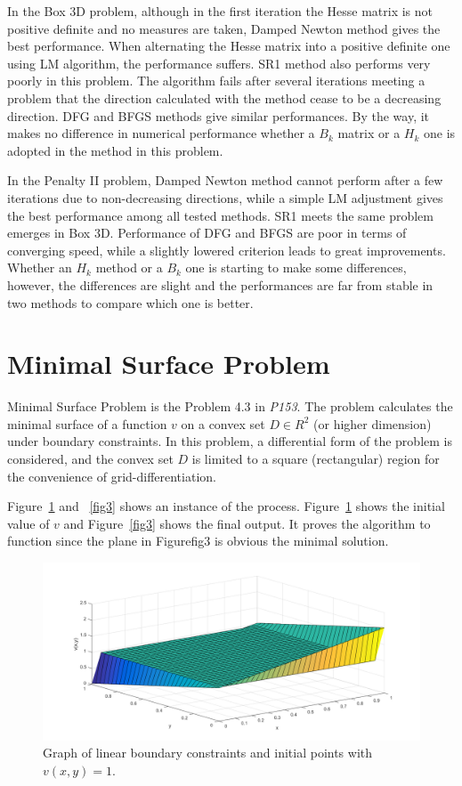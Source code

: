 \documentclass{article}
\begin{document}
In the Box 3D problem, although in the first iteration the Hesse matrix is not positive definite and no measures are taken, Damped Newton method gives the best performance. When alternating the Hesse matrix into a positive definite one using LM algorithm, the performance suffers. SR1 method also performs very poorly in this problem. The algorithm fails after several iterations meeting a problem that the direction calculated with the method cease to be a decreasing direction. DFG and BFGS methods give similar performances. By the way, it makes no difference in numerical performance whether a $B_k$ matrix or a $H_k$ one is adopted in the method in this problem.

In the Penalty II problem, Damped Newton method cannot perform after a few iterations due to non-decreasing directions, while a simple LM adjustment gives the best performance among all tested methods. SR1 meets the same problem emerges in Box 3D. Performance of DFG and BFGS are poor in terms of converging speed, while a slightly lowered criterion leads to great improvements. Whether an $H_k$ method or a $B_k$ one is starting to make some differences, however, the differences are slight and the performances are far from stable in two methods to compare which one is better.

\section{Minimal Surface Problem}

Minimal Surface Problem is the Problem 4.3 in \textit{P153}. The problem calculates the minimal surface of a function $v$ on a convex set $D \in R^2$ (or higher dimension) under boundary constraints. In this problem, a differential form of the problem is considered, and the convex set $D$ is limited to a square (rectangular) region for the convenience of grid-differentiation.

Figure~\ref{fig2} and ~\ref{fig3} shows an instance of the process. Figure~\ref{fig2} shows the initial value of $v$ and Figure~\ref{fig3} shows the final output. It proves the algorithm to function since the plane in Figure{fig3} is obvious the minimal solution.

\begin{figure}[ht]
\label{fig2}
\vskip 0.2in
\begin{center}
\centerline{\includegraphics[width=\columnwidth]{init}}
\caption{Graph of linear boundary constraints and initial points with $v(x,y)=1$.}
\end{center}
\vskip -0.2in
\end{figure}
\end{document}
